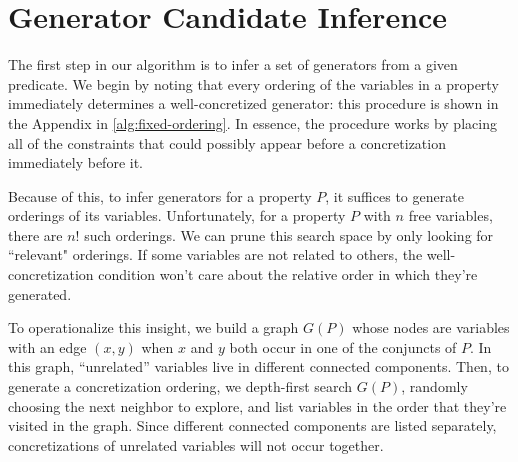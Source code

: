 \documentclass[sigconf,nonacm]{acmart}
\begin{document}
\section{Generator Candidate Inference}
\label{sec:sci}
The first step in our algorithm is to infer a set of generators from a given
predicate. We begin by noting that every ordering of the variables in a property
immediately determines a well-concretized generator:
this procedure is shown in the Appendix in \autoref{alg:fixed-ordering}.
In essence, the procedure works by placing all of the constraints that could possibly
appear before a concretization immediately before it.

Because of this, to infer generators for a property $P$, it suffices to
generate orderings of its variables. Unfortunately, for a property $P$ with
$n$ free variables, there are $n!$ such orderings.
We can prune this search space by only looking for ``relevant"
orderings. If some variables are not related to others, the well-concretization
condition won't care about the relative order in which they're generated.


To operationalize this insight, we build a graph $G(P)$ whose nodes are variables
with an edge $(x,y)$ when $x$ and $y$ both occur in one of the conjuncts of $P$. In
this graph, ``unrelated'' variables live in different connected components.
Then, to generate a concretization ordering, we depth-first search $G(P)$, randomly
choosing the next neighbor to explore,
and list variables in the order that they're visited in the graph.
Since different connected components are listed separately, concretizations of unrelated variables
will not occur together.

\end{document}
